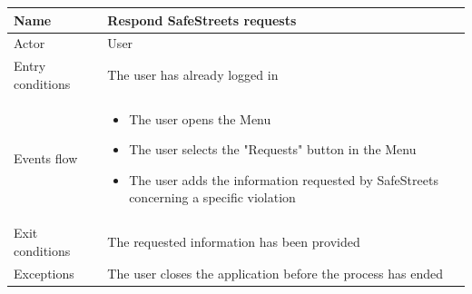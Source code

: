 \documentclass{article}
\begin{document}
\begin{table}[H]
    \begin{tabular}{|l|l|}
    \hline
    Name & \begin{minipage}[t]{0.7\textwidth} Respond SafeStreets requests\end{minipage} \\ \hline  
     Actor & \begin{minipage}[t]{0.7\textwidth} User \end{minipage} \\ \hline 
     Entry conditions & \begin{minipage}[t]{0.7\textwidth}  The user has already
     logged in \end{minipage} \\
     \hline 
     Events flow & \begin{minipage}[t]{0.7\textwidth} 
    \begin{itemize}
        \item The user opens the Menu
        \item The user selects the "Requests" button in the Menu
        \item The user adds the information requested by SafeStreets concerning a
        specific violation
    \end{itemize}    
    \end{minipage} \\ \hline
     Exit conditions & \begin{minipage}[t]{0.7\textwidth} The requested
     information has been provided\end{minipage} \\
     \hline
     Exceptions & \begin{minipage}[t]{0.7\textwidth}
     The user closes the application before the process has ended  \end{minipage} \\ \hline
    \end{tabular}
\end{table}
\end{document}
